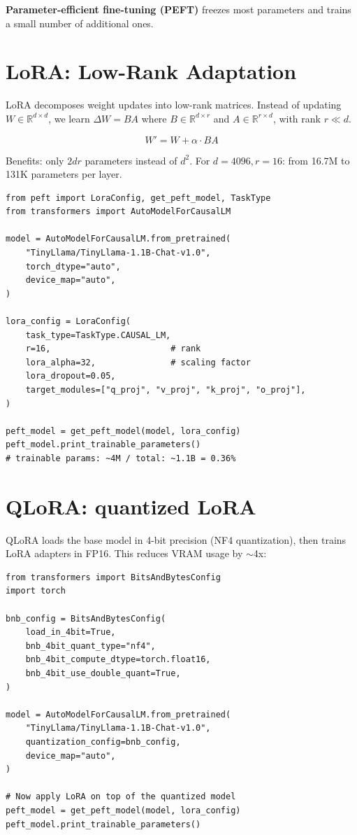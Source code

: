 \textbf{Parameter-efficient fine-tuning (PEFT)} freezes most parameters and trains a small number of additional ones.

\section{LoRA: Low-Rank Adaptation}

LoRA decomposes weight updates into low-rank matrices. Instead of updating $W \in \mathbb{R}^{d \times d}$, we learn $\Delta W = BA$ where $B \in \mathbb{R}^{d \times r}$ and $A \in \mathbb{R}^{r \times d}$, with rank $r \ll d$.

\[
W' = W + \alpha \cdot BA
\]

Benefits: only $2dr$ parameters instead of $d^2$. For $d=4096, r=16$: from 16.7M to 131K parameters per layer.

\begin{verbatim}
from peft import LoraConfig, get_peft_model, TaskType
from transformers import AutoModelForCausalLM

model = AutoModelForCausalLM.from_pretrained(
    "TinyLlama/TinyLlama-1.1B-Chat-v1.0",
    torch_dtype="auto",
    device_map="auto",
)

lora_config = LoraConfig(
    task_type=TaskType.CAUSAL_LM,
    r=16,                        # rank
    lora_alpha=32,               # scaling factor
    lora_dropout=0.05,
    target_modules=["q_proj", "v_proj", "k_proj", "o_proj"],
)

peft_model = get_peft_model(model, lora_config)
peft_model.print_trainable_parameters()
# trainable params: ~4M / total: ~1.1B = 0.36%
\end{verbatim}

\section{QLoRA: quantized LoRA}

QLoRA loads the base model in 4-bit precision (NF4 quantization), then trains LoRA adapters in FP16. This reduces VRAM usage by $\sim$4x:

\begin{verbatim}
from transformers import BitsAndBytesConfig
import torch

bnb_config = BitsAndBytesConfig(
    load_in_4bit=True,
    bnb_4bit_quant_type="nf4",
    bnb_4bit_compute_dtype=torch.float16,
    bnb_4bit_use_double_quant=True,
)

model = AutoModelForCausalLM.from_pretrained(
    "TinyLlama/TinyLlama-1.1B-Chat-v1.0",
    quantization_config=bnb_config,
    device_map="auto",
)

# Now apply LoRA on top of the quantized model
peft_model = get_peft_model(model, lora_config)
peft_model.print_trainable_parameters()
\end{verbatim}

